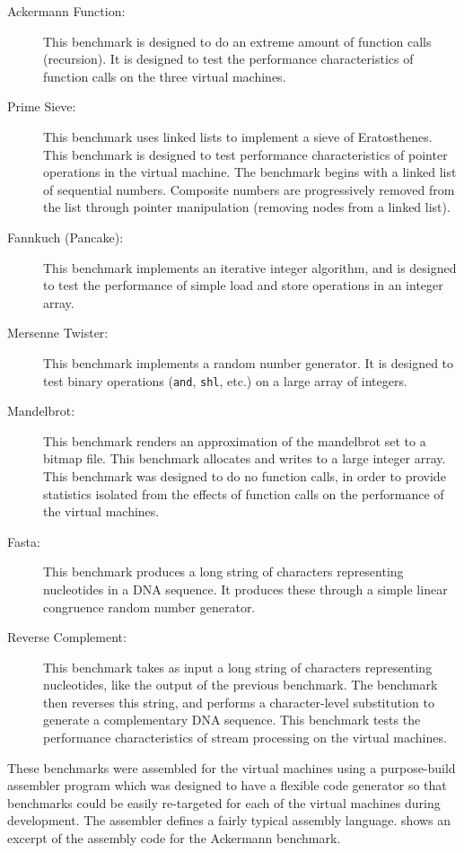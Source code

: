 	\begin{description}
		\item[Ackermann Function:] This benchmark is designed to do an extreme amount of function calls (recursion). It is designed to test the performance characteristics of function calls on the three virtual machines.
		\item[Prime Sieve:] This benchmark uses linked lists to implement a sieve of Eratosthenes. This benchmark is designed to test performance characteristics of pointer operations in the virtual machine. The benchmark begins with a linked list of sequential numbers. Composite numbers are progressively removed from the list through pointer manipulation (removing nodes from a linked list).
		\item[Fannkuch (Pancake):] This benchmark implements an iterative integer algorithm, and is designed to test the performance of simple load and store operations in an integer array.
		\item[Mersenne Twister:] This benchmark implements a random number generator. It is designed to test binary operations (\texttt{and}, \texttt{shl}, etc.) on a large array of integers.
		\item[Mandelbrot:] This benchmark renders an approximation of the mandelbrot set to a bitmap file. This benchmark allocates and writes to a large integer array. This benchmark was designed to do no function calls, in order to provide statistics isolated from the effects of function calls on the performance of the virtual machines.
		\item[Fasta:] This benchmark produces a long string of characters representing nucleotides in a DNA sequence. It produces these through a simple linear congruence random number generator. 
		\item[Reverse Complement:] This benchmark takes as input a long string of characters representing nucleotides, like the output of the previous benchmark. The benchmark then reverses this string, and performs a character-level substitution to generate a complementary DNA sequence. This benchmark tests the performance characteristics of stream processing on the virtual machines.
	\end{description}
	
	These benchmarks were assembled for the virtual machines using a purpose-build assembler program which was designed to have a flexible code generator so that benchmarks could be easily re-targeted for each of the virtual machines during development. The assembler defines a fairly typical assembly language.  shows an excerpt of the assembly code for the Ackermann benchmark.
	
